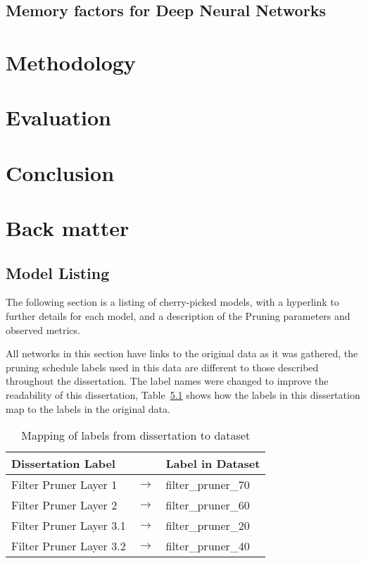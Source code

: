 \documentclass[11pt]{report}
\begin{document}
\newpage
\section{Memory factors for Deep Neural Networks}\label{subsec:hardwareArch}


\newpage



\chapter{Methodology}



\chapter{Evaluation}


\chapter{Conclusion}


\newpage
\appendix
\chapter{Back matter}
\section{Model Listing}
The following section is a listing of cherry-picked models, with a hyperlink to further details for each model, and a description of the Pruning parameters and observed metrics.

All networks in this section have links to the original data as it was gathered, the pruning schedule labels used in this data are different to those described throughout the dissertation. 
The label names were changed to improve the readability of this dissertation, Table~\ref{tab:labelMapping} shows how the labels in this dissertation map to the labels in the original data. 


\begin{table}[H]
    \centering
    \begin{tabular}{@{}lll@{}}
    \toprule
    \textbf{Dissertation Label} &                & \textbf{Label in Dataset} \\ \hline
    Filter Pruner Layer 1       & $\rightarrow$ & filter\_pruner\_70        \\
    Filter Pruner Layer 2       & $\rightarrow$ & filter\_pruner\_60        \\
    Filter Pruner Layer 3.1     & $\rightarrow$ & filter\_pruner\_20        \\
    Filter Pruner Layer 3.2     & $\rightarrow$ & filter\_pruner\_40        \\ \hline
    \end{tabular}
    \caption{Mapping of labels from dissertation to dataset}
    \label{tab:labelMapping}
\end{table}
\end{document}
